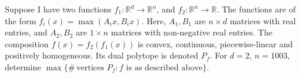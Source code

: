 Suppose I have two functions \( f_1: \mathbb R^d \to \mathbb R^n \), and \( f_2: \mathbb R^n \to \mathbb R \). The functions are of the form \( f_i(x) = \max(A_i x, B_i x) \). Here, \( A_1, B_1 \) are \( n \times d \) matrices with real entries, and \( A_2, B_2 \) are \( 1 \times n \) matrices with non-negative real entries. The composition $f(x) = f_2(f_1(x))$ is convex, continuous, piecewise-linear and positively homogeneous. Its dual polytope is denoted $P_f$. For $d = 2$, $n = 1003$, determine $\max\{ \#\, \text{vertices } P_f : f \text{ is as described above} \}$.
